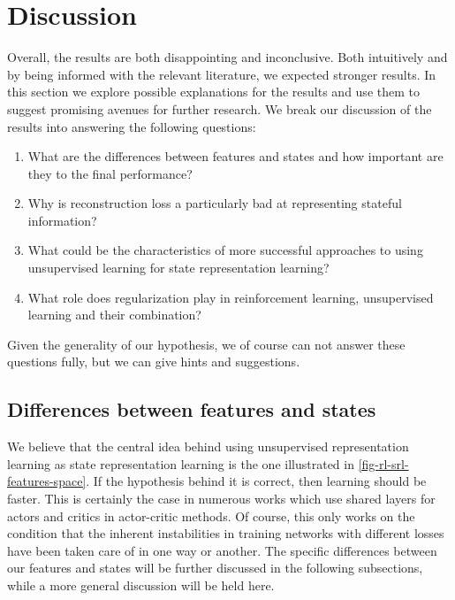 \chapter{Discussion}
\label{ch-discussion}
Overall, the results are both disappointing and inconclusive.
Both intuitively and by being informed with the relevant literature,
we expected stronger results. 
In this section we explore possible explanations for the results
and use them to suggest promising avenues for further research.
We break our discussion of the results into answering the following questions:
\begin{enumerate}
		\item What are the differences between features and states 
				and how important are they to the final performance?
		\item Why is reconstruction loss a particularly bad at representing
				stateful information?
		\item What could be the characteristics of more successful approaches
				to using unsupervised learning for state representation learning?
		\item What role does regularization play in reinforcement learning,
				unsupervised learning and their combination?
\end{enumerate}

Given the generality of our hypothesis, we of course can not answer these questions fully,
but we can give hints and suggestions.

\section{Differences between features and states}
We believe that the central idea behind using unsupervised representation learning
as state representation learning is the one illustrated in \ref{fig-rl-srl-features-space}.
If the hypothesis behind it is correct, then learning should be faster.
This is certainly the case in numerous works which use shared layers for actors 
and critics in actor-critic methods.
Of course, this only works on the condition that
the inherent instabilities in training networks with different losses have been taken care of 
in one way or another.
The specific differences between our features and states will be further discussed in
the following subsections, while a more general discussion will be held here.

